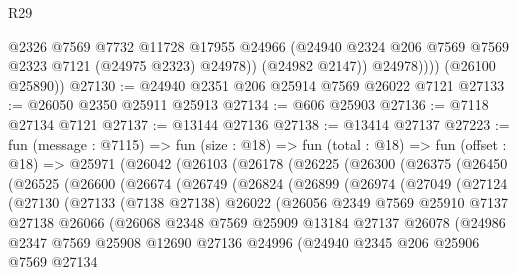 \begin{lexlean}{R29}
\begin{coremodule}
                  @2326
                  @7569
                  @7732
                  @11728
                  @17955
                  @24966
                  (@24940 @2324 @206 @7569 @7569 @2323 @7121 (@24975 @2323) @24978))
                (@24982 @2147))
              @24978))))
      (@26100 @25890))
@27130 := @24940 @2351 @206 @25914 @7569 @26022 @7121
@27133 := @26050 @2350 @25911 @25913
@27134 := @606 @25903
@27136 := @7118 @27134 @7121
@27137 := @13144 @27136
@27138 := @13414 @27137
@27223 := fun (message : @7115) =>
  fun (size : @18) =>
  fun (total : @18) =>
  fun (offset : @18) =>
  @25971
    (@26042
      (@26103
        (@26178
          (@26225
            (@26300
              (@26375
                (@26450
                  (@26525
                    (@26600
                      (@26674
                        (@26749
                          (@26824
                            (@26899
                              (@26974
                                (@27049
                                  (@27124
                                    (@27130
                                      (@27133
                                        (@7138 @27138)
                                        @26022
                                        (@26056
                                          @2349
                                          @7569
                                          @25910
                                          @7137
                                          @27138
                                          @26066
                                          (@26068
                                            @2348
                                            @7569
                                            @25909
                                            @13184
                                            @27137
                                            @26078
                                            (@24986
                                              @2347
                                              @7569
                                              @25908
                                              @12690
                                              @27136
                                              @24996
                                              (@24940
                                                @2345
                                                @206
                                                @25906
                                                @7569
                                                @27134

\end{coremodule}
\end{lexlean}
